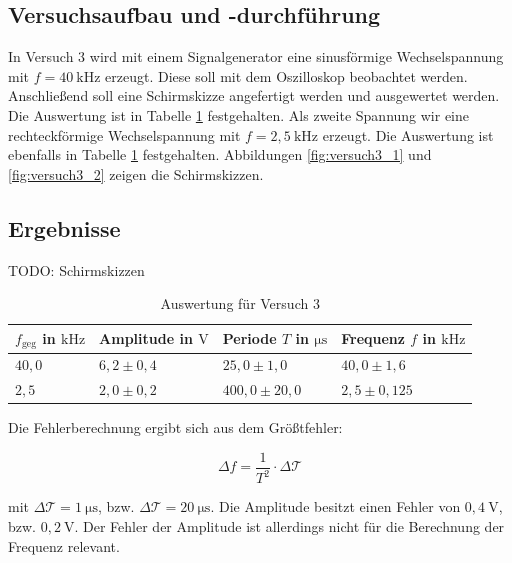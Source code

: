     \subsection{Versuchsaufbau und -durchführung}
        
        In Versuch 3 wird mit einem Signalgenerator eine sinusförmige Wechselspannung mit $f = 40\ \mathrm{kHz}$ erzeugt. Diese soll mit dem Oszilloskop beobachtet werden. Anschließend soll eine Schirmskizze angefertigt werden und ausgewertet werden. Die Auswertung ist in Tabelle \ref{tab:versuch3} festgehalten. Als zweite Spannung wir eine rechteckförmige Wechselspannung mit $f = 2,5\ \mathrm{kHz}$ erzeugt. Die Auswertung ist ebenfalls in Tabelle \ref{tab:versuch3} festgehalten.
        Abbildungen \ref{fig:versuch3_1} und \ref{fig:versuch3_2} zeigen die Schirmskizzen.

    \subsection{Ergebnisse}

        TODO: Schirmskizzen

        \begin{table}[h!]
            \centering
            \begin{tabular}{|l|l|l|l|}
                \hline
                $f_{\mathrm{geg}}$ in $\mathrm{kHz}$ & Amplitude in $\mathrm{V}$ & Periode $T$ in $\mathrm{\mu s}$ & Frequenz $f$ in $\mathrm{kHz}$\\
                \hline\hline
                $40,0$ & $6,2 \pm 0,4$ & $25,0 \pm 1,0$ & $40,0 \pm 1,6$\\
                \hline
                $2,5$ & $2,0 \pm 0,2$ & $400,0 \pm 20,0$ & $2,5 \pm 0,125$\\
                \hline
            \end{tabular}
            \caption{Auswertung für Versuch 3}
            \label{tab:versuch3}
        \end{table}

        Die Fehlerberechnung ergibt sich aus dem Größtfehler:

        \begin{equation}
            \Delta f = \frac{1}{T^2} \cdot \Delta \mathcal{T}
        \end{equation}

        mit $\Delta \mathcal{T} = 1\ \mathrm{\mu s}$, bzw. $\Delta \mathcal{T} = 20\ \mathrm{\mu s}$. Die Amplitude besitzt einen Fehler von $0,4\ \mathrm{V}$, bzw. $0,2\ \mathrm{V}$. Der Fehler der Amplitude ist allerdings nicht für die Berechnung der Frequenz relevant.

